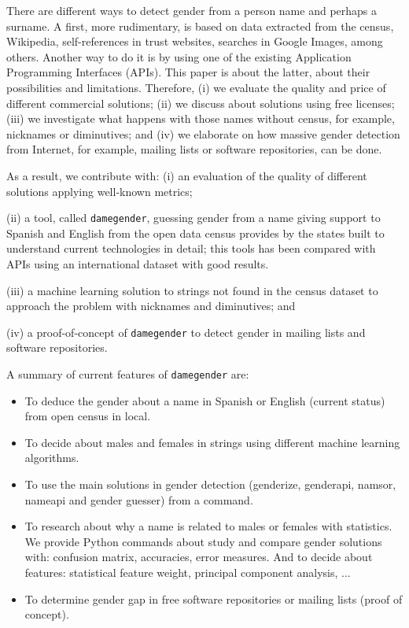 \documentclass[a4paper]{article}
\begin{document}
There are different ways to detect gender from a person name and perhaps a surname.
A first, more rudimentary, is based on data extracted from the census, Wikipedia, self-references in trust websites, searches in Google Images, among others.
Another way to do it is by using one of the existing Application Programming Interfaces (APIs).
This paper is about the latter, about their possibilities and limitations.
Therefore, (i) we evaluate the quality and price of different commercial solutions;
(ii) we discuss about solutions using free licenses;
(iii) we investigate what happens with those names without census, for example, nicknames or diminutives; and
(iv) we elaborate on how massive gender detection from Internet, for example, mailing
  lists or software repositories, can be done.

As a result, we contribute with: 
(i) an evaluation of the quality of different solutions applying well-known metrics;

(ii) a tool, called \texttt{damegender}, guessing gender from a name
  giving support to Spanish and English from the open data census
  provides by the states built to understand current technologies in
  detail; this tools has been compared with APIs using an international
  dataset with good results.
  
(iii) a machine learning solution to strings not found in the census
  dataset to approach the problem with nicknames and diminutives; and
  
(iv) a proof-of-concept of \texttt{damegender} to detect
  gender in mailing lists and software repositories.

A summary of current features of \texttt{damegender} are:

\begin{itemize}
 \item To deduce the gender about a name in Spanish or English (current status) from open census in local.
 \item To decide about males and females in strings using different machine learning algorithms.
 \item To use the main solutions in gender detection (genderize, genderapi, namsor, nameapi and gender guesser) from a command.
 \item To research about why a name is related to males or females with statistics. We provide Python commands about study and compare gender solutions with: confusion matrix, accuracies, error measures. And to decide about features: statistical feature weight, principal component analysis, ...
 \item To determine gender gap in free software repositories or mailing lists (proof of concept).
\end{itemize}
\end{document}

